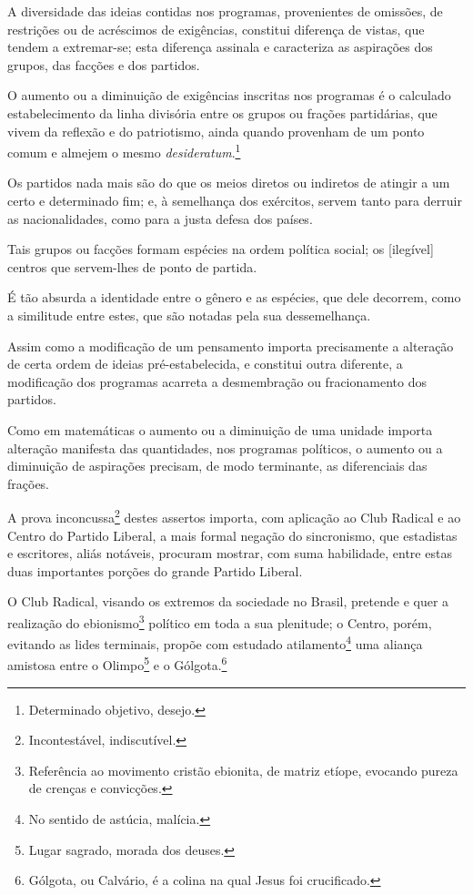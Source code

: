 A diversidade das ideias contidas nos programas, provenientes de
omissões, de restrições ou de acréscimos de exigências, constitui
diferença de vistas, que tendem a extremar-se; esta diferença assinala e
caracteriza as aspirações dos grupos, das facções e dos partidos.

O aumento ou a diminuição de exigências inscritas nos programas é o
calculado estabelecimento da linha divisória entre os grupos ou frações
partidárias, que vivem da reflexão e do patriotismo, ainda quando
provenham de um ponto comum e almejem o mesmo \textit{desideratum}.\footnote{
  Determinado objetivo, desejo.}

Os partidos nada mais são do que os meios diretos ou indiretos de
atingir a um certo e determinado fim; e, à semelhança dos exércitos,
servem tanto para derruir as nacionalidades, como para a justa defesa
dos países.

Tais grupos ou facções formam espécies na ordem política social; os
{[}ilegível{]} centros que servem-lhes de ponto de partida.

É tão absurda a identidade entre o gênero e as espécies, que dele
decorrem, como a similitude entre estes, que são notadas pela sua
dessemelhança.

Assim como a modificação de um pensamento importa precisamente a
alteração de certa ordem de ideias pré-estabelecida, e constitui outra
diferente, a modificação dos programas acarreta a desmembração ou
fracionamento dos partidos.

Como em matemáticas o aumento ou a diminuição de uma unidade importa
alteração manifesta das quantidades, nos programas políticos, o aumento
ou a diminuição de aspirações precisam, de modo terminante, as
diferenciais das frações.

A prova inconcussa\footnote{Incontestável, indiscutível.} destes
assertos importa, com aplicação ao Club Radical e ao Centro do Partido
Liberal, a mais formal negação do sincronismo, que estadistas e
escritores, aliás notáveis, procuram mostrar, com suma habilidade, entre
estas duas importantes porções do grande Partido Liberal.

O Club Radical, visando os extremos da sociedade no Brasil, pretende e
quer a realização do ebionismo\footnote{Referência ao movimento
  cristão ebionita, de matriz etíope, evocando pureza de crenças e
  convicções.} político em toda a sua plenitude; o Centro, porém,
evitando as lides terminais, propõe com estudado atilamento\footnote{
  No sentido de astúcia, malícia.} uma aliança amistosa entre o
Olimpo\footnote{Lugar sagrado, morada dos deuses.} e o
Gólgota.\footnote{Gólgota, ou Calvário, é a colina na qual Jesus foi
  crucificado.}

